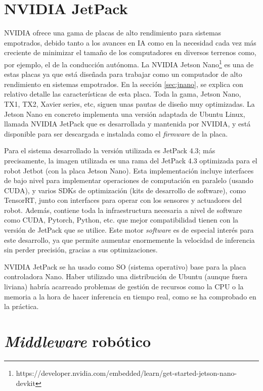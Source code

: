 
\section{NVIDIA JetPack}
\label{sec:jetpack}

NVIDIA ofrece una gama de placas de alto rendimiento para sistemas empotrados, debido tanto a los avances en IA como en la necesidad cada vez más creciente de minimizar el tamaño de los computadores en diversos terrenos como, por ejemplo, el de la conducción autónoma. La NVIDIA Jetson Nano\footnote{https://developer.nvidia.com/embedded/learn/get-started-jetson-nano-devkit} es una de estas placas ya que está diseñada para trabajar como un computador de alto rendimiento en sistemas empotrados. En la sección \ref{sec:jnano}, se explica con relativo detalle las características de esta placa. Toda la gama, Jetson Nano, TX1, TX2, Xavier series, etc, siguen unas pautas de diseño muy optimizadas. La Jetson Nano en concreto implementa una versión adaptada de Ubuntu Linux, llamada NVIDIA JetPack que es desarrollada y mantenida por NVIDIA, y está disponible para ser descargada e instalada como el \textit{firmware} de la placa. 

Para el sistema desarrollado la versión utilizada es JetPack 4.3; más precisamente, la imagen utilizada es una rama del JetPack 4.3 optimizada para el robot Jetbot (con la placa Jetson Nano). Esta implementación incluye interfaces de bajo nivel para implementar operaciones de computación en paralelo (usando CUDA), y varios SDKs de optimización (kits de desarrollo de software), como TensorRT, junto con interfaces para operar con los sensores y actuadores del robot. Además, contiene toda la infraestructura necesaria a nivel de software como CUDA, Pytorch, Python, etc. que mejor compatibilidad tienen con la versión de JetPack que se utilice. Este motor \textit{software} es de especial interés para este desarrollo, ya que permite aumentar enormemente la velocidad de inferencia sin perder precisión, gracias a sus optimizaciones.

NVIDIA JetPack se ha usado como SO (sistema operativo) base para la placa controladora Nano. Haber utilizado una distribución de Ubuntu (aunque fuera liviana) habría acarreado problemas de gestión de recursos como la CPU o la memoria a la hora de hacer inferencia en tiempo real, como se ha comprobado en la práctica.

\section{\textit{Middleware} robótico}

